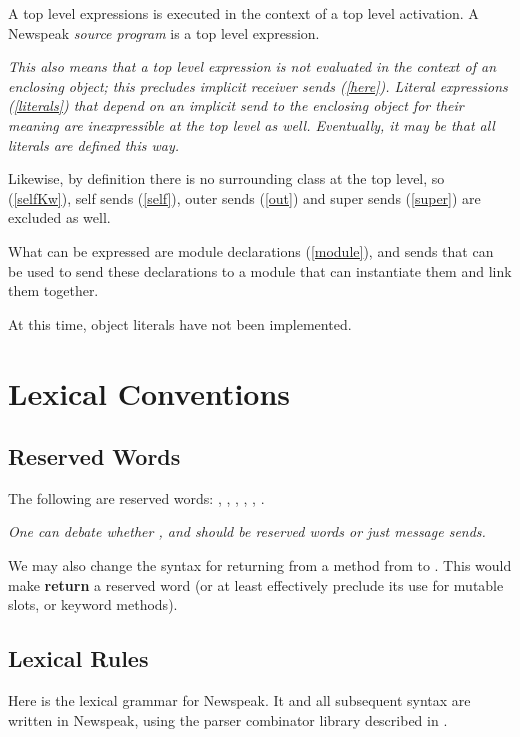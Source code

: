 \documentclass{article}
\begin{document}
A top level expressions is executed in the context of a top level activation. A Newspeak {\em source program} is a top level expression.
{\it
This also means that a top level expression is not evaluated in the context of an enclosing object; this precludes implicit receiver sends (\ref{here}).  Literal expressions (\ref{literals}) that depend on an implicit send to the enclosing object for their meaning are inexpressible at the top level as well. Eventually, it may be that all literals are defined this way.

Likewise, by definition there is no surrounding class at the top level, so \SELF{} (\ref{selfKw}), self sends (\ref{self}), outer sends (\ref{out}) and super sends (\ref{super}) are excluded as well.

What can be expressed are module declarations (\ref{module}), and sends that can be used to send these declarations to a module that can instantiate them and link them together.

At this time, object literals have not been implemented. 
}

 


\section{Lexical Conventions}
\label{lex}

\subsection{Reserved Words}
\label{reserved}
 
The following  are reserved words: \SELF, \SUPER, \OUTER, \TRUE, \FALSE, \NIL.

{\it 
One can debate whether \TRUE, \FALSE{} and \NIL{} should be reserved words or just message sends. 

We may also change the syntax for returning from a method from  to . This would make {\bf return} a reserved word (or at least effectively preclude its use for mutable slots, or keyword methods).
}


\subsection{Lexical Rules}
\label{lexrules}

Here is the lexical grammar for Newspeak. It and all subsequent syntax are written in Newspeak, using the parser combinator library described in \cite{bracha07a}.
\end{document}
